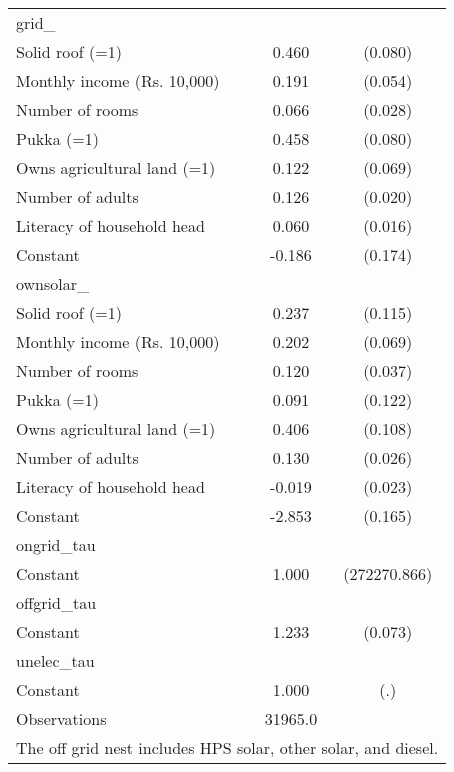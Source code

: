 \begin{table}[htbp]
\begin{tabular}{l*{1}{cc}}
\midrule
grid\_               &                     &            \\
Solid roof (=1)     &       0.460\sym{***}&     (0.080)\\
Monthly income (Rs. 10,000)&       0.191\sym{***}&     (0.054)\\
Number of rooms     &       0.066\sym{**} &     (0.028)\\
Pukka (=1)          &       0.458\sym{***}&     (0.080)\\
Owns agricultural land (=1)&       0.122\sym{*}  &     (0.069)\\
Number of adults    &       0.126\sym{***}&     (0.020)\\
Literacy of household head&       0.060\sym{***}&     (0.016)\\
Constant            &      -0.186         &     (0.174)\\
\midrule
ownsolar\_           &                     &            \\
Solid roof (=1)     &       0.237\sym{**} &     (0.115)\\
Monthly income (Rs. 10,000)&       0.202\sym{***}&     (0.069)\\
Number of rooms     &       0.120\sym{***}&     (0.037)\\
Pukka (=1)          &       0.091         &     (0.122)\\
Owns agricultural land (=1)&       0.406\sym{***}&     (0.108)\\
Number of adults    &       0.130\sym{***}&     (0.026)\\
Literacy of household head&      -0.019         &     (0.023)\\
Constant            &      -2.853\sym{***}&     (0.165)\\
\midrule
ongrid\_tau          &                     &            \\
Constant            &       1.000         &(272270.866)\\
\midrule
offgrid\_tau         &                     &            \\
Constant            &       1.233\sym{***}&     (0.073)\\
\midrule
unelec\_tau          &                     &            \\
Constant            &       1.000         &         (.)\\
\midrule
Observations        &     31965.0         &            \\
\bottomrule
\multicolumn{3}{l}{\footnotesize The off grid nest includes HPS solar, other solar, and diesel.}\\
\end{tabular}
\end{table}
